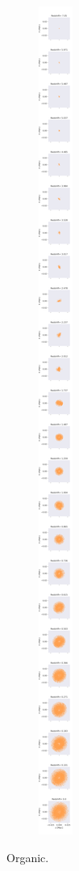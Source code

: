 \documentclass{article}
\begin{document}
\begin{figure}
\begin{subfigure} {.325\columnwidth}
		\end{subfigure}
			\hfill
		\begin{subfigure} {.325\columnwidth}
				\centering 
				\includegraphics[width=\columnwidth]{../../plots/coordinates_plotter/Organic_z-x_coordinates_evolution.png}
		\end{subfigure}
		
		\caption{Organic.}
	\end{figure}
\end{document}
